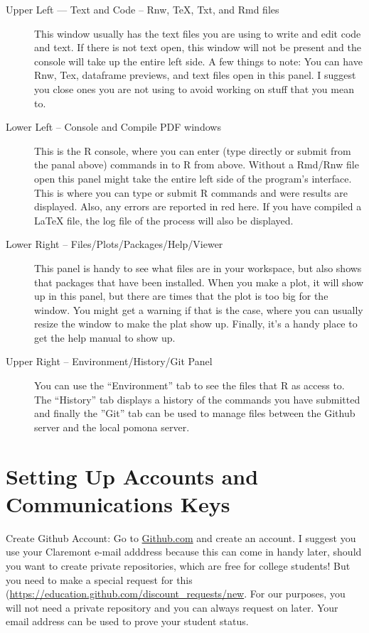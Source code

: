 \documentclass[12pt]{../SOP4_alpha}
\begin{document}
\begin{description}
  \item[Upper Left --- Text and Code -- Rnw, \TeX, Txt, and Rmd files] This window usually has the text files you are using to write and edit code and text. If there is not text open, this window will not be present and the console will take up the entire left side. A few things to note: You can have Rnw, Tex, dataframe previews, and text files open in this panel. I suggest you close ones you are not using to avoid working on stuff that you mean to.  
  
  \item[Lower Left -- Console and Compile PDF windows] This is the R console, where you can enter (type directly or submit from the panal above) commands in to R from above. Without a Rmd/Rnw file open this panel might take the entire left side of the program's interface. This is where you can type or submit R commands and were results are displayed. Also, any errors are reported in red here. If you have compiled a LaTeX file, the log file of the process will also be displayed.
  
  \item[Lower Right -- Files/Plots/Packages/Help/Viewer] This panel is handy to see what files are in your workspace, but also shows that packages that have been installed. When you make a plot, it will show up in this panel, but there are times that the plot is too big for the window. You might get a warning if that is the case, where you can usually resize the window to make the plat show up. Finally, it's a handy place to get the help manual to show up. 

  \item[Upper Right -- Environment/History/Git Panel] You can use the ``Environment'' tab to see the files that R as access to. The ``History'' tab displays a history of the commands you have submitted and finally the ''Git'' tab can be used to manage files between the Github server and the local pomona server. 
  
\end{description}

\section{Setting Up Accounts and Communications Keys}

\NP Create Github Account: Go to \href{http:\\github.com}{Github.com} and create an account. I suggest you use your Claremont e-mail adddress because this can come in handy later, should you want to create private repositories, which are free for college students! But you need to make a special request for this (\url{https://education.github.com/discount_requests/new}. For our purposes, you will not need a private repository and you can always request on later. Your email address can be used to prove your student status. 
  
\end{document}
